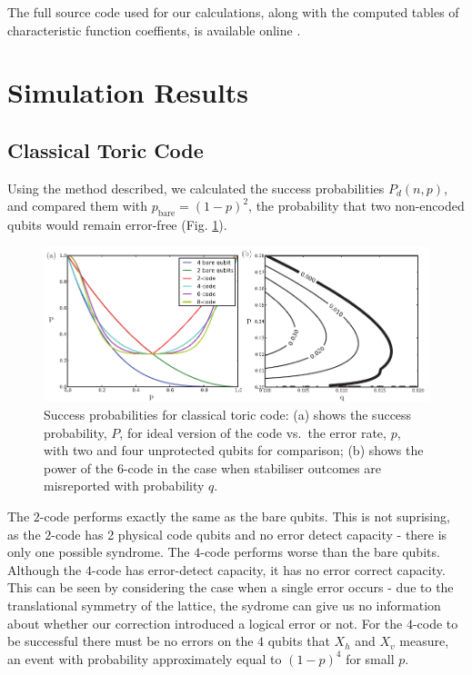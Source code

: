 The full source code used for our calculations, along with the computed tables of characteristic function coeffients, is available online \cite{toric_code_program}.

\section{Simulation Results}

\subsection{Classical Toric Code}

Using the method described, we calculated the success probabilities $P_d(n, p)$, and compared them with $p_{\text{bare}} = (1-p)^2$, the probability that two non-encoded qubits would remain error-free (Fig. \ref{x_results}).
\begin{figure}[htb]
  \begin{center}
    \includegraphics{figures/x_results.pdf}
  \end{center}
  \caption{Success probabilities for classical toric code: (a) shows the success probability, $P$, for ideal version of the code vs.\ the error rate, $p$, with two and four unprotected qubits for comparison; (b) shows the power of the $6$-code in the case when stabiliser outcomes are misreported with probability $q$.}
  \label{x_results}
\end{figure}

The $2$-code performs exactly the same as the bare qubits. This is not suprising, as the $2$-code has 2 physical code qubits and no error detect capacity - there is only one possible syndrome. The $4$-code performs worse than the bare qubits. Although the $4$-code has error-detect capacity, it has no error correct capacity. This can be seen by considering the case when a single error occurs - due to the translational symmetry of the lattice, the sydrome can give us no information about whether our correction introduced a logical error or not. For the $4$-code to be successful there must be no errors on the $4$ qubits that $X_h$ and $X_v$ measure, an event with probability approximately equal to $(1-p)^4$ for small $p$.

